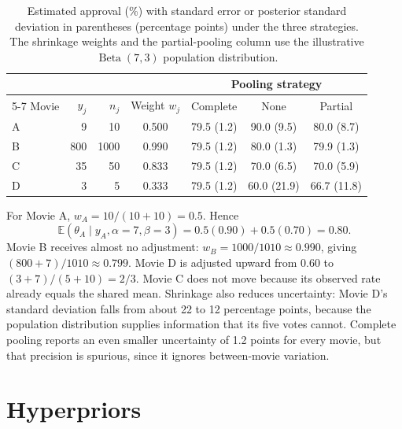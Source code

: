 \documentclass[11pt,a4paper]{article}
\newcommand{\E}{\mathbb{E}}
\newcommand{\BetaD}{\operatorname{Beta}}
\begin{document}
\begin{table}[htbp]
\centering
\caption{Estimated approval (\%) with standard error or posterior standard deviation in parentheses (percentage points) under the three strategies. The shrinkage weights and the partial-pooling column use the illustrative $\BetaD(7,3)$ population distribution.}
\label{tab:pooling-compare}
\begin{tabular}{lrrcccc}
\toprule
 & & & & \multicolumn{3}{c}{Pooling strategy}\\
\cmidrule(lr){5-7}
Movie & $y_j$ & $n_j$ & Weight $w_j$ & Complete & None & Partial \\
\midrule
A & 9 & 10 & 0.500 & 79.5 (1.2) & 90.0 (9.5) & 80.0 (8.7) \\
B & 800 & 1000 & 0.990 & 79.5 (1.2) & 80.0 (1.3) & 79.9 (1.3) \\
C & 35 & 50 & 0.833 & 79.5 (1.2) & 70.0 (6.5) & 70.0 (5.9) \\
D & 3 & 5 & 0.333 & 79.5 (1.2) & 60.0 (21.9) & 66.7 (11.8) \\
\bottomrule
\end{tabular}
\end{table}

For Movie A, $w_A=10/(10+10)=0.5$. Hence
\begin{equation}
 \E(\theta_A\mid y_A,\alpha=7,\beta=3)
 =0.5(0.90)+0.5(0.70)=0.80.
\end{equation}
Movie B receives almost no adjustment: $w_B=1000/1010\approx0.990$, giving $(800+7)/1010\approx0.799$. Movie D is adjusted upward from 0.60 to $(3+7)/(5+10)=2/3$. Movie C does not move because its observed rate already equals the shared mean. Shrinkage also reduces uncertainty: Movie D's standard deviation falls from about 22 to 12 percentage points, because the population distribution supplies information that its five votes cannot. Complete pooling reports an even smaller uncertainty of 1.2 points for every movie, but that precision is spurious, since it ignores between-movie variation.

\section{Hyperpriors}
\label{sec:hyperpriors}
\end{document}
